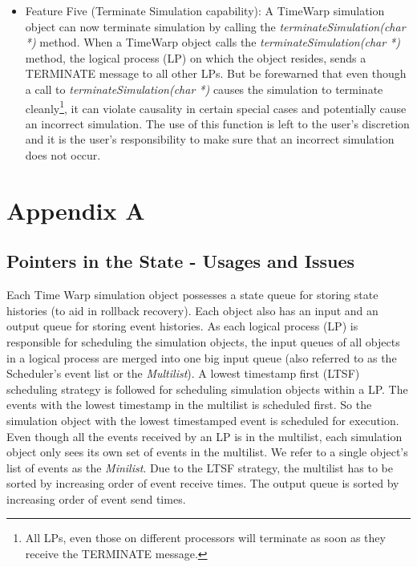 \documentclass[11pt]{report}
\begin{document}
\begin{itemize}
\item Feature Five (Terminate Simulation capability): A TimeWarp
simulation object can now terminate simulation by calling the {\it
terminateSimulation(char *)} method. When a TimeWarp object calls the {\it
terminateSimulation(char *)} method, the logical process (LP) on which the
object resides, sends a TERMINATE message to all other LPs. But be
forewarned that even though a call to {\it terminateSimulation(char *)}
causes the simulation to terminate cleanly\footnote{All LPs, even those on
different processors will terminate as soon as they receive the TERMINATE
message.}, it can violate causality in certain special cases and
potentially cause an incorrect simulation. The use of this function is
left to the user's discretion and it is the user's responsibility to make
sure that an incorrect simulation does not occur.
\end{itemize}

\chapter*{Appendix A}

\section*{Pointers in the State - Usages and Issues}

Each Time Warp simulation object possesses a state queue for storing state
histories (to aid in rollback recovery). Each object also has an input and
an output queue for storing event histories. As each logical process (LP)
is responsible for scheduling the simulation objects, the input queues of
all objects in a logical process are merged into one big input queue (also
referred to as the Scheduler's event list or the
\emph{Multilist}). A lowest timestamp first (LTSF) scheduling strategy is
followed for scheduling simulation objects within a LP. The events with
the lowest timestamp in the multilist is scheduled first. So the
simulation object with the lowest timestamped event is scheduled for
execution. Even though all the events received by an LP is in the
multilist, each simulation object only sees its own set of events in the
multilist. We refer to a single object's list of events as the
\emph{Minilist}. Due to the LTSF strategy, the multilist has to be sorted
by increasing order of event receive times. The output queue is sorted by
increasing order of event send times.
\end{document}
